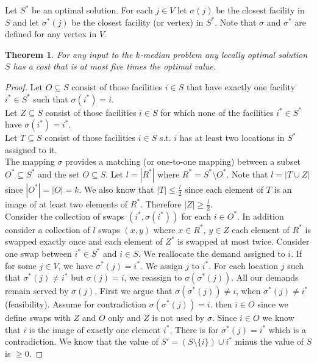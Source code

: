 \documentclass{article}
\newtheorem*{thm}{Theorem}
\theoremstyle{definition}
\begin{document}
Let $S^*$ be an optimal solution.
For each $j\in V$ let $\sigma(j)$ be the closest facility in $S$ and let $\sigma^*(j)$ be the closest facility (or vertex) in $S^*$.
Note that $\sigma$ and $\sigma^*$ are defined for any vertex in $V$.

\begin{thm}
For any input to the $k$-median problem any locally optimal solution $S$ has a cost that is at most five times the optimal value.
\end{thm}


\begin{proof}
Let $O\subseteq S$ consist of those facilities $i\in S$ that have exactly one facility $i^*\in S^*$ such that $\sigma(i^*) = i$. \\
Let $Z \subseteq S$ consist of those facilities $i\in S$ for which none of the facilities $i^* \in S^*$ have $\sigma(i^*) = i^*$. \\
Let $T\subseteq S$ consist of those facilities $i\in S$ s.t. $i$ has at least two locations in $S^*$ assigned to it. \\
The mapping $\sigma$ provides a matching (or one-to-one mapping) between a subset $O^*\subseteq S^*$ and the set $O\subseteq S$.
Let $l= |R^*|$ where $R^* = S^*\setminus O^*$.
Note that $l=|T\cup Z|$ since $|O^*| = |O| = k$.
We also know that $|T|\le \frac{l}{2}$ since each element of $T$ is an image of at least two elements of $R^*$.
Therefore $|Z| \ge \frac{l}{2}$. \\
Consider the collection of swaps $(i^*,\sigma(i^*))$ for each $i\in O^*$.
In addition consider a collection of $l$ swaps $(x,y)$ where $x\in R^*$, $y\in Z$ each element of $R^*$ is swapped exactly once and each element of $Z^*$ is swapped at most twice.
Consider one swap between $i^*\in S^*$ and $i\in S$.
We reallocate the demand assigned to $i$. %
If for some $j\in V$, we have $\sigma^*(j)= i^*$.
We assign $j$ to $i^*$.
For each location $j$ such that $\sigma^*(j) \ne i^*$ but $\sigma(j) = i$, we reassign to $\sigma(\sigma^*(j))$.
All our demands remain served by $\sigma(j)$.
First we argue that $\sigma(\sigma^*(j))\ne i$, when $\sigma^*(j) \ne i^*$ (feasibility).
Assume for contradiction $\sigma(\sigma^*(j)) = i$.
then $i\in O$ since we define swaps with $Z$ and $O$ only and $Z$ is not used by $\sigma$.
Since $i\in O$ we know that $i$ is the image of exactly one element $i^*$,
There is for $\sigma^*(j) = i^*$ which is a contradiction.
We know that the value of $S' = (S\setminus \{i\})\cup i^*$ minus the value of $S$ is $\ge 0$.

\end{proof}
\end{document}
